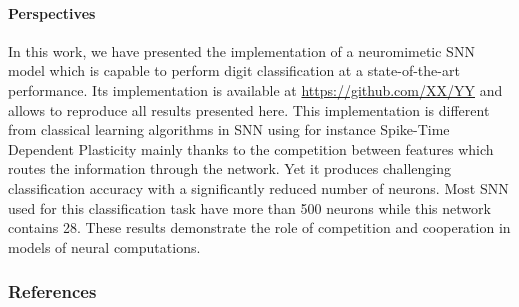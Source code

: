 \documentclass[12pt]{article}
\begin{document}
\paragraph*{Perspectives}
In this work, we have presented the implementation of a neuromimetic SNN model which is capable to perform digit classification at a state-of-the-art performance. Its implementation is available at \url{https://github.com/XX/YY} and allows to reproduce all results presented here.
This implementation is different from classical learning algorithms in SNN using for instance Spike-Time Dependent Plasticity mainly thanks to the competition between features which routes the information through the network. Yet it produces challenging classification accuracy with a significantly reduced number of neurons. Most SNN used for this classification task have more than 500 neurons while this network contains 28. These results demonstrate the role of competition and cooperation in models of neural computations. 

%


\subsubsection*{References}
  \vspace{-15pt}
{
\small
\begingroup
{}
\setlength\bibitemsep{1pt}
\printbibliography[heading=none]
\endgroup
}



\end{document}
